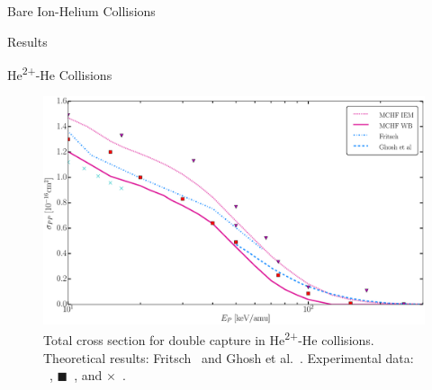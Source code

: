 \documentclass[letterpaper, 11 pt]{report}
\begin{document}
\begin{chapter}{Bare Ion-Helium Collisions \label{chap:p-he2p-he}}
\begin{section}{Results \label{sec:phe2p-res}}
\begin{subsection}{\texorpdfstring{He\textsuperscript{2+}}{He2+}-He Collisions
                         \label{sec:he2phe-res}}
         \begin{figure}[h]
            \centering
            \includegraphics[width = 0.95 \linewidth]{./images/he2phe/he2phe-PP.eps}
            \caption[Total cross section for double capture in He\textsuperscript{2+}-He
                     collisions.]{Total cross section for double capture in He\textsuperscript{2+}-He
                     collisions.
                     Theoretical results: Fritsch~\cite{Fritsch-94} and Ghosh
                     et al.~\cite{GDMP-08}.
                     Experimental data: {\color{RedViolet}{$\blacktriangledown$}}~\cite{Dubois87},
                     {\color{red}$\blacksquare$}~\cite{Rudd85}, and
                     {\color{TealBlue}$\times$}~\cite{SG74}. \label{fig:he2phe-pp}}
         \end{figure}


\end{subsection}
\end{section}
\end{chapter}
\end{document}

